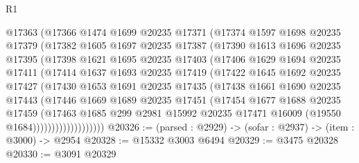 \begin{lexlean}{R1}
\begin{coremodule}
              @17363
              (@17366
                @1474
                @1699
                @20235
                @17371
                (@17374
                  @1597
                  @1698
                  @20235
                  @17379
                  (@17382
                    @1605
                    @1697
                    @20235
                    @17387
                    (@17390
                      @1613
                      @1696
                      @20235
                      @17395
                      (@17398
                        @1621
                        @1695
                        @20235
                        @17403
                        (@17406
                          @1629
                          @1694
                          @20235
                          @17411
                          (@17414
                            @1637
                            @1693
                            @20235
                            @17419
                            (@17422
                              @1645
                              @1692
                              @20235
                              @17427
                              (@17430
                                @1653
                                @1691
                                @20235
                                @17435
                                (@17438
                                  @1661
                                  @1690
                                  @20235
                                  @17443
                                  (@17446
                                    @1669
                                    @1689
                                    @20235
                                    @17451
                                    (@17454
                                      @1677
                                      @1688
                                      @20235
                                      @17459
                                      (@17463
                                        @1685
                                        @299
                                        @2981
                                        @15992
                                        @20235
                                        @17471
                                        @16009
                                        (@19550 @1684)))))))))))))))))))
@20326 := (parsed : @2929) -> (sofar : @2937) -> (item : @3000) -> @2954
@20328 := @15332 @3003 @6494
@20329 := @3475 @20328
@20330 := @3091 @20329

\end{coremodule}
\end{lexlean}

